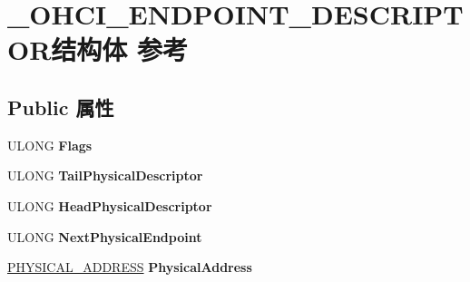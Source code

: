 \hypertarget{struct___o_h_c_i___e_n_d_p_o_i_n_t___d_e_s_c_r_i_p_t_o_r}{}\section{\+\_\+\+O\+H\+C\+I\+\_\+\+E\+N\+D\+P\+O\+I\+N\+T\+\_\+\+D\+E\+S\+C\+R\+I\+P\+T\+O\+R结构体 参考}
\label{struct___o_h_c_i___e_n_d_p_o_i_n_t___d_e_s_c_r_i_p_t_o_r}
\subsection*{Public 属性}
\begin{DoxyCompactItemize}
\item 
\mbox{\label{struct___o_h_c_i___e_n_d_p_o_i_n_t___d_e_s_c_r_i_p_t_o_r_af81cb6bdde927e6c996f4c8b271725db}} 
U\+L\+O\+NG {\bfseries Flags}
\item 
\mbox{\label{struct___o_h_c_i___e_n_d_p_o_i_n_t___d_e_s_c_r_i_p_t_o_r_adcd68ef43dbb930a0f1d01bc58fd5f64}} 
U\+L\+O\+NG {\bfseries Tail\+Physical\+Descriptor}
\item 
\mbox{\label{struct___o_h_c_i___e_n_d_p_o_i_n_t___d_e_s_c_r_i_p_t_o_r_afd659441ccdca7567f6d5fb4336da720}} 
U\+L\+O\+NG {\bfseries Head\+Physical\+Descriptor}
\item 
\mbox{\label{struct___o_h_c_i___e_n_d_p_o_i_n_t___d_e_s_c_r_i_p_t_o_r_a97dbb3a70d961794dea91f3179225c11}} 
U\+L\+O\+NG {\bfseries Next\+Physical\+Endpoint}
\item 
\mbox{\label{struct___o_h_c_i___e_n_d_p_o_i_n_t___d_e_s_c_r_i_p_t_o_r_adfc8c5174a437e7afa7bac8eed19e5c1}} 
\hyperlink{union___l_a_r_g_e___i_n_t_e_g_e_r}{P\+H\+Y\+S\+I\+C\+A\+L\+\_\+\+A\+D\+D\+R\+E\+SS} {\bfseries Physical\+Address}
\item 
\mbox{\label{struct___o_h_c_i___e_n_d_p_o_i_n_t___d_e_s_c_r_i_p_t_o_r_ad5221e1e78f3dedb84cefd3315dd677c}} 

\end{DoxyCompactItemize}
